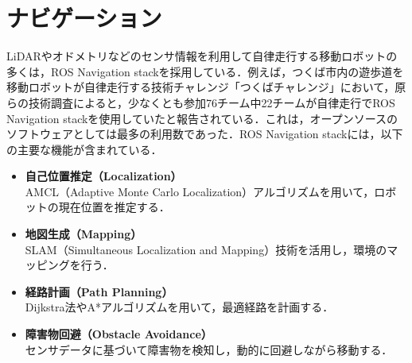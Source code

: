 
\section{ナビゲーション}\label{sec:navigation-stack}
LiDARやオドメトリなどのセンサ情報を利用して自律走行する移動ロボットの多くは，ROS Navigation stack\cite{nav1,nav2}を採用している．例えば，つくば市内の遊歩道を移動ロボットが自律走行する技術チャレンジ「つくばチャレンジ」において，原らの技術調査\cite{robomech2024-hara}によると，少なくとも参加76チーム中22チームが自律走行でROS Navigation stackを使用していたと報告されている．これは，オープンソースのソフトウェアとしては最多の利用数であった．ROS Navigation stackには，以下の主要な機能が含まれている．

\begin{itemize}
     \item \textbf{自己位置推定（Localization）}\\
     AMCL（Adaptive Monte Carlo Localization）アルゴリズムを用いて，ロボットの現在位置を推定する．
     \item \textbf{地図生成（Mapping）}\\
     SLAM（Simultaneous Localization and Mapping）技術を活用し，環境のマッピングを行う．
     \item \textbf{経路計画（Path Planning）}\\
     Dijkstra法\cite{dijkstra2022note}やA*アルゴリズム\cite{hart1968formal-astar}を用いて，最適経路を計画する．
     \item \textbf{障害物回避（Obstacle Avoidance）}\\
     センサデータに基づいて障害物を検知し，動的に回避しながら移動する．
\end{itemize}

\newpage
